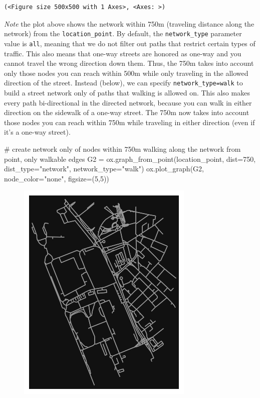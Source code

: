 \documentclass[
  letterpaper,
  DIV=11,
  numbers=noendperiod]{scrreprt}
\newenvironment{Shaded}{\begin{snugshade}}{\end{snugshade}}
\newcommand{\CommentTok}[1]{\textcolor[rgb]{0.37,0.37,0.37}{#1}}
\newcommand{\DecValTok}[1]{\textcolor[rgb]{0.68,0.00,0.00}{#1}}
\newcommand{\NormalTok}[1]{\textcolor[rgb]{0.00,0.23,0.31}{#1}}
\newcommand{\OperatorTok}[1]{\textcolor[rgb]{0.37,0.37,0.37}{#1}}
\newcommand{\StringTok}[1]{\textcolor[rgb]{0.13,0.47,0.30}{#1}}
\begin{document}
\begin{verbatim}
(<Figure size 500x500 with 1 Axes>, <Axes: >)
\end{verbatim}

\emph{Note} the plot above shows the network within 750m (traveling
distance along the network) from the \texttt{location\_point}. By
default, the \texttt{network\_type} parameter value is \texttt{all},
meaning that we do not filter out paths that restrict certain types of
traffic. This also means that one-way streets are honored as one-way and
you cannot travel the wrong direction down them. Thus, the 750m takes
into account only those nodes you can reach within 500m while only
traveling in the allowed direction of the street. Instead (below), we
can specify
\texttt{network\_type=\textquotesingle{}walk\textquotesingle{}} to build
a street network only of paths that walking is allowed on. This also
makes every path bi-directional in the directed network, because you can
walk in either direction on the sidewalk of a one-way street. The 750m
now takes into account those nodes you can reach within 750m while
traveling in either direction (even if it's a one-way street).

\begin{Shaded}
\begin{Highlighting}[]
\CommentTok{\# create network only of nodes within 750m walking along the network from point, only walkable edges}
\NormalTok{G2 }\OperatorTok{=}\NormalTok{ ox.graph\_from\_point(location\_point, dist}\OperatorTok{=}\DecValTok{750}\NormalTok{, dist\_type}\OperatorTok{=}\StringTok{"network"}\NormalTok{, network\_type}\OperatorTok{=}\StringTok{"walk"}\NormalTok{)}
\NormalTok{ox.plot\_graph(G2, node\_color}\OperatorTok{=}\StringTok{"none"}\NormalTok{, figsize}\OperatorTok{=}\NormalTok{(}\DecValTok{5}\NormalTok{,}\DecValTok{5}\NormalTok{))}
\end{Highlighting}
\end{Shaded}

\begin{figure}[H]

{\centering \includegraphics{labs/w07_OSM_files/figure-pdf/cell-9-output-1.png}

}

\end{figure}
\end{document}
